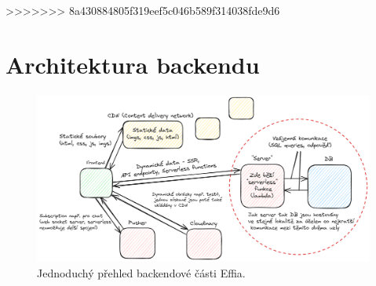 \documentclass[12pt, a4paper,
openright
]{report}
\begin{document}
>>>>>>> 8a430884805f319eef5c046b589f314038fde9d6
\section{Architektura backendu}
\begin{figure}[h!]
	\centering %
	\includegraphics[width=1\linewidth]{image/effio-architecture-simple.png} 
	\caption{Jednoduchý přehled backendové části Effia.} %
	\label{fig:effio-architecture} %
\end{figure}
\end{document}
